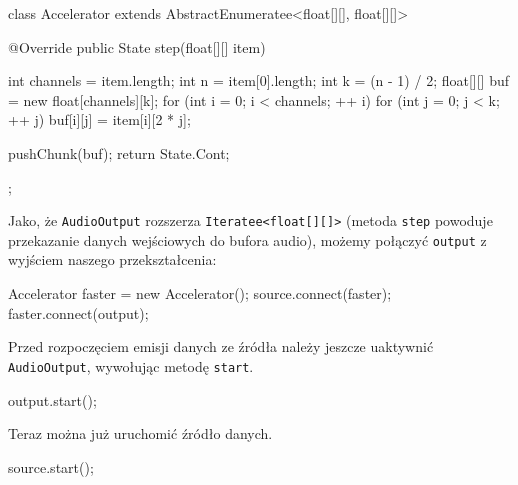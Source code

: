 \begin{java}
class Accelerator extends AbstractEnumeratee<float[][], float[][]> {

    @Override
    public State step(float[][] item) {
        int channels = item.length;
        int n = item[0].length;
        int k = (n - 1) / 2;
        float[][] buf = new float[channels][k];
        for (int i = 0; i < channels; ++ i) {
            for (int j = 0; j < k; ++ j) {
                buf[i][j] = item[i][2 * j];
            }
        }

        pushChunk(buf);
        return State.Cont;
    }
};
\end{java}

Jako, że \texttt{AudioOutput} rozszerza \texttt{Iteratee<float[][]>} (metoda \texttt{step} powoduje
przekazanie danych wejściowych do bufora audio), możemy połączyć \texttt{output} z wyjściem naszego
przekształcenia:

\begin{java}
Accelerator faster = new Accelerator();
source.connect(faster);
faster.connect(output);
\end{java}

Przed rozpoczęciem emisji danych ze źródła należy jeszcze uaktywnić \texttt{AudioOutput}, wywołując
metodę \texttt{start}.

\begin{java}
output.start();
\end{java}

Teraz można już uruchomić źródło danych.

\begin{java}
source.start();
\end{java}

